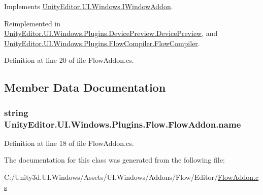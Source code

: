 Implements \hyperlink{interface_unity_editor_1_1_u_i_1_1_windows_1_1_i_window_addon_a44291bf0e7f5ef49eab1239526da08c9}{Unity\+Editor.\+U\+I.\+Windows.\+I\+Window\+Addon}.



Reimplemented in \hyperlink{class_unity_editor_1_1_u_i_1_1_windows_1_1_plugins_1_1_device_preview_1_1_device_preview_a9277594a2cc92fc67cab8cd690affa62}{Unity\+Editor.\+U\+I.\+Windows.\+Plugins.\+Device\+Preview.\+Device\+Preview}, and \hyperlink{class_unity_editor_1_1_u_i_1_1_windows_1_1_plugins_1_1_flow_compiler_1_1_flow_compiler_a7bbe37ce600a45af8cdc34a608537d23}{Unity\+Editor.\+U\+I.\+Windows.\+Plugins.\+Flow\+Compiler.\+Flow\+Compiler}.



Definition at line 20 of file Flow\+Addon.\+cs.



\subsection{Member Data Documentation}
\hypertarget{class_unity_editor_1_1_u_i_1_1_windows_1_1_plugins_1_1_flow_1_1_flow_addon_ac982c5f7283d9dc684dd254dea14342f}{}
\subsubsection[{name}]{\setlength{\rightskip}{0pt plus 5cm}string Unity\+Editor.\+U\+I.\+Windows.\+Plugins.\+Flow.\+Flow\+Addon.\+name}\label{class_unity_editor_1_1_u_i_1_1_windows_1_1_plugins_1_1_flow_1_1_flow_addon_ac982c5f7283d9dc684dd254dea14342f}


Definition at line 18 of file Flow\+Addon.\+cs.



The documentation for this class was generated from the following file\+:\begin{DoxyCompactItemize}
\item 
C\+:/\+Unity3d.\+U\+I.\+Windows/\+Assets/\+U\+I.\+Windows/\+Addons/\+Flow/\+Editor/\hyperlink{_flow_addon_8cs}{Flow\+Addon.\+cs}\end{DoxyCompactItemize}
